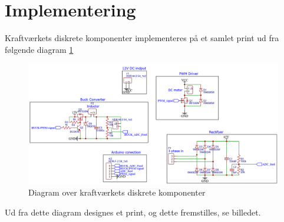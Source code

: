 \documentclass[../main.tex]{subfiles}
\begin{document}
\section{Implementering}
Kraftværkets diskrete komponenter implementeres på et samlet print ud fra følgende diagram \ref{fig: Kraftverk_diagram_samlet}
\begin{figure}[H]
      \includegraphics[width=\textwidth]{Dokumentation/Figures/Kraftverk_diagram_samlet.png}
     \caption{Diagram over kraftværkets diskrete komponenter}
     \label{fig: Kraftverk_diagram_samlet}
\end{figure}
Ud fra dette diagram designes et print, og dette fremstilles, se billedet.
\end{document}
